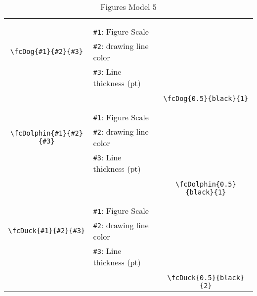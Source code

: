\documentclass{article}
\begin{document}
\begin{table}[H]
\begin{tabular}{|c|l|c|}
	&&\multirow{5}{*}{\fcDog{0.5}{black}{1}}\\	&&\\	&\verb|#1|: Figure Scale &\\	\verb|\fcDog{#1}{#2}{#3}|&	\verb|#2|: drawing line color &\\	&\verb|#3|: Line thickness (pt) &\\ &&\\&&	\verb|\fcDog{0.5}{black}{1}|\\\hline 	
	&&\multirow{5}{*}{\fcDolphin{0.5}{black}{1}}\\	&&\\	&\verb|#1|: Figure Scale &\\	\verb|\fcDolphin{#1}{#2}{#3}|&	\verb|#2|: drawing line color &\\	&\verb|#3|: Line thickness (pt) &\\ &&\\&&	\verb|\fcDolphin{0.5}{black}{1}|\\\hline 	
	&&\multirow{5}{*}{\fcDuck{0.5}{black}{2}}\\	&&\\	&\verb|#1|: Figure Scale &\\	\verb|\fcDuck{#1}{#2}{#3}|&	\verb|#2|: drawing line color &\\	&\verb|#3|: Line thickness (pt) &\\ &&\\&&	\verb|\fcDuck{0.5}{black}{2}|\\\hline 	\hline\end{tabular}\caption{Figures Model 5}\label{tab5}\end{table}
\end{document}
